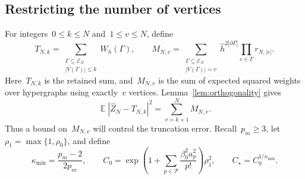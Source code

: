 \documentclass[letterpaper,11pt,reqno]{amsart}
\renewcommand{\leq}{\leqslant}
\renewcommand{\geq}{\geqslant}
\DeclareMathOperator{\E}{\mathds{E}}
\newcommand{\hh}{\hat{h}}
\begin{document}
\subsection{Restricting the number of vertices}\label{subsec:higher-support}

For integers~$0\leq k\leq N$ and~$1\leq v\leq N$, define
\begin{equation}\label{eq:higher-retained-sum}
T_{N,k}=\sum_{\substack{\Gamma\subseteq\mathcal E_N\\|V(\Gamma)|\leq k}}W_h(\Gamma),
\qquad M_{N,v}=\sum_{\substack{\Gamma\subseteq\mathcal E_N\\|V(\Gamma)|=v}}
\hh^{2|\partial\Gamma|}\prod_{e\in\Gamma}r_{N,|e|}.
\end{equation}
Here~$T_{N,k}$ is the retained sum, and~$M_{N,v}$ is the sum of expected squared weights over hypergraphs using exactly~$v$ vertices. Lemma~\ref{lem:orthogonality} gives
\begin{equation*}
\E|\widehat Z_N-T_{N,k}|^2=\sum_{v=k+1}^N M_{N,v}.
\end{equation*}
Thus a bound on~$M_{N,v}$ will control the truncation error. Recall~$p_m\geq3$, let~$\rho_1=\max\{1,\rho_0\}$, and define
\begin{equation*}
\kappa_{\min}=\frac{p_m-2}{2p_m},\qquad
C_0=\exp\!\left(1+\sum_{p\in\mathcal P}\frac{\beta_0^2a_p^2}{p!}\right)\rho_1^2,
\qquad C_\star=C_0^{1/\kappa_{\min}}.
\end{equation*}
\end{document}
